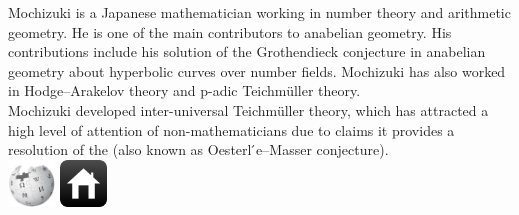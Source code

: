 \documentclass[9pt]{beamer}
\begin{document}
\begin{frame}
            \begin{columns}\label{mochizuki}
                    \justify
                    Mochizuki is a Japanese mathematician working in number theory and arithmetic geometry. He is one of the main contributors to anabelian geometry. His contributions include his solution of the Grothendieck conjecture in anabelian geometry about hyperbolic curves over number fields. Mochizuki has also worked in Hodge–Arakelov theory and p-adic Teichmüller theory. \\\vspace{0.50cm}
                    Mochizuki developed inter-universal Teichmüller theory, which has attracted a high level of attention of non-mathematicians due to claims it provides a resolution of the \hyperlink{abc}{} (also known as Oesterl ́e–Masser conjecture).\\\vspace{0.50cm}
                \pause
                    \href{https://en.wikipedia.org/wiki/Shinichi_Mochizuki}{
                        \includegraphics[width=1.25cm, height=1.25cm]{images/wiki.png}}
                    \vspace{0.8cm}
                    \href{https://www.kurims.kyoto-u.ac.jp/~motizuki/top-english.html}{
                        \includegraphics[width=1.25cm, height=1.25cm]{images/home.png}}
            \end{columns}
        \end{frame}

\end{document}
